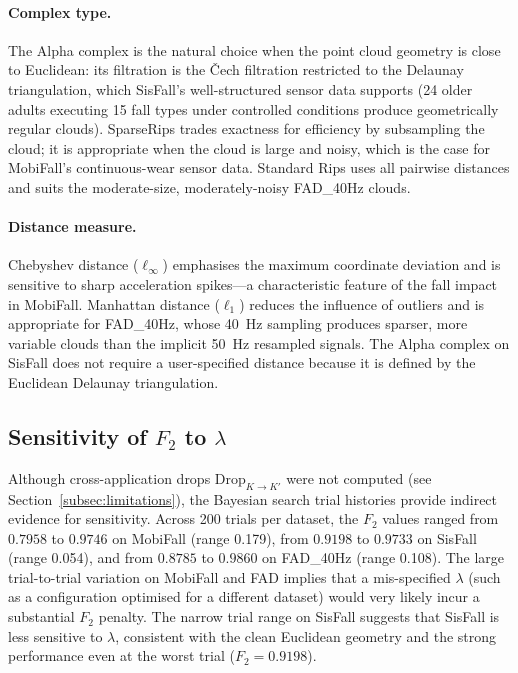 \documentclass[onluarkali,ingilizce,yukseklisans,karton,LisansustuEgitim]{itutez}
\providecommand{\1}{\mathbf{1}}
\begin{document}
\paragraph{Complex type.}
The Alpha complex is the natural choice when the point cloud geometry is close to
Euclidean: its filtration is the Čech filtration restricted to the Delaunay triangulation,
which SisFall's well-structured sensor data supports (24 older adults executing 15 fall
types under controlled conditions produce geometrically regular clouds).  SparseRips
trades exactness for efficiency by subsampling the cloud; it is appropriate when the
cloud is large and noisy, which is the case for MobiFall's continuous-wear sensor data.
Standard Rips uses all pairwise distances and suits the moderate-size, moderately-noisy
FAD\_40Hz clouds.

\paragraph{Distance measure.}
Chebyshev distance ($\ell_\infty$) emphasises the maximum coordinate deviation and is
sensitive to sharp acceleration spikes---a characteristic feature of the fall impact in
MobiFall.  Manhattan distance ($\ell_1$) reduces the influence of outliers and is
appropriate for FAD\_40Hz, whose 40~Hz sampling produces sparser, more variable clouds
than the implicit 50~Hz resampled signals.  The Alpha complex on SisFall does not
require a user-specified distance because it is defined by the Euclidean Delaunay
triangulation.

\subsection{Sensitivity of $F_2$ to $\lambda$}

Although cross-application drops $\mathrm{Drop}_{K\to K'}$ were not computed (see
Section~\ref{subsec:limitations}), the Bayesian search trial histories provide indirect
evidence for sensitivity.  Across 200 trials per dataset, the $F_2$ values ranged from
$0.7958$ to $0.9746$ on MobiFall (range 0.179), from $0.9198$ to $0.9733$ on SisFall
(range 0.054), and from $0.8785$ to $0.9860$ on FAD\_40Hz (range 0.108).  The large
trial-to-trial variation on MobiFall and FAD implies that a mis-specified $\lambda$
(such as a configuration optimised for a different dataset) would very likely incur
a substantial $F_2$ penalty.  The narrow trial range on SisFall suggests that SisFall
is less sensitive to $\lambda$, consistent with the clean Euclidean geometry and the
strong performance even at the worst trial ($F_2=0.9198$).
\end{document}
